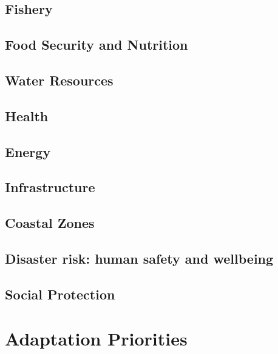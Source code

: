 \documentclass[
]{book}
\begin{document}
\hypertarget{fishery}{%
\section{Fishery}\label{fishery}}

\hypertarget{food-security-and-nutrition}{%
\section{Food Security and Nutrition}\label{food-security-and-nutrition}}

\hypertarget{water-resources}{%
\section{Water Resources}\label{water-resources}}

\hypertarget{health}{%
\section{Health}\label{health}}

\hypertarget{energy}{%
\section{Energy}\label{energy}}

\hypertarget{infrastructure}{%
\section{Infrastructure}\label{infrastructure}}

\hypertarget{coastal-zones}{%
\section{Coastal Zones}\label{coastal-zones}}

\hypertarget{disaster-risk-human-safety-and-wellbeing}{%
\section{Disaster risk: human safety and wellbeing}\label{disaster-risk-human-safety-and-wellbeing}}

\hypertarget{social-protection}{%
\section{Social Protection}\label{social-protection}}

\hypertarget{adaptation-priorities}{%
\chapter{Adaptation Priorities}\label{adaptation-priorities}}
\end{document}
